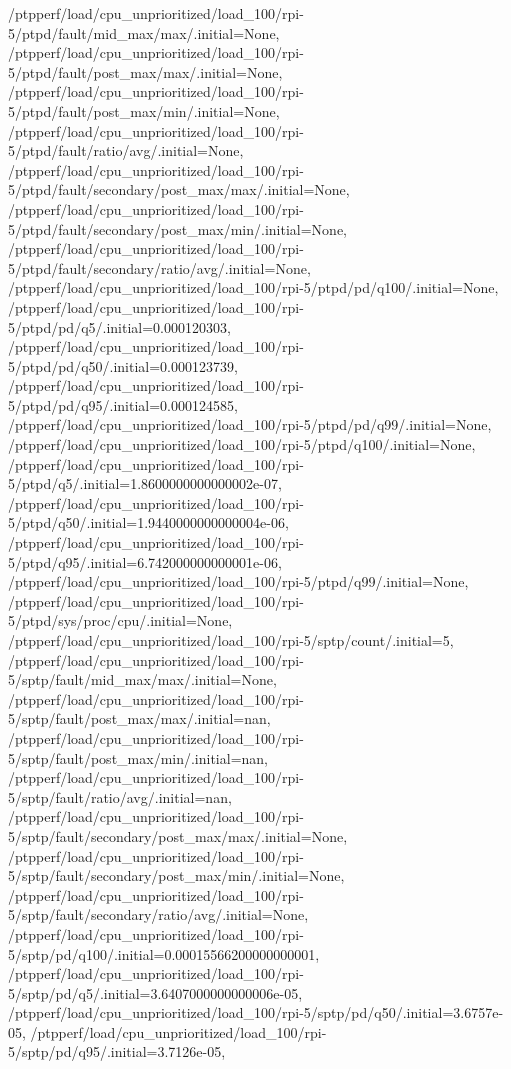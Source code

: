 {    /ptpperf/load/cpu_unprioritized/load_100/rpi-5/ptpd/fault/mid_max/max/.initial=None,
    /ptpperf/load/cpu_unprioritized/load_100/rpi-5/ptpd/fault/post_max/max/.initial=None,
    /ptpperf/load/cpu_unprioritized/load_100/rpi-5/ptpd/fault/post_max/min/.initial=None,
    /ptpperf/load/cpu_unprioritized/load_100/rpi-5/ptpd/fault/ratio/avg/.initial=None,
    /ptpperf/load/cpu_unprioritized/load_100/rpi-5/ptpd/fault/secondary/post_max/max/.initial=None,
    /ptpperf/load/cpu_unprioritized/load_100/rpi-5/ptpd/fault/secondary/post_max/min/.initial=None,
    /ptpperf/load/cpu_unprioritized/load_100/rpi-5/ptpd/fault/secondary/ratio/avg/.initial=None,
    /ptpperf/load/cpu_unprioritized/load_100/rpi-5/ptpd/pd/q100/.initial=None,
    /ptpperf/load/cpu_unprioritized/load_100/rpi-5/ptpd/pd/q5/.initial=0.000120303,
    /ptpperf/load/cpu_unprioritized/load_100/rpi-5/ptpd/pd/q50/.initial=0.000123739,
    /ptpperf/load/cpu_unprioritized/load_100/rpi-5/ptpd/pd/q95/.initial=0.000124585,
    /ptpperf/load/cpu_unprioritized/load_100/rpi-5/ptpd/pd/q99/.initial=None,
    /ptpperf/load/cpu_unprioritized/load_100/rpi-5/ptpd/q100/.initial=None,
    /ptpperf/load/cpu_unprioritized/load_100/rpi-5/ptpd/q5/.initial=1.8600000000000002e-07,
    /ptpperf/load/cpu_unprioritized/load_100/rpi-5/ptpd/q50/.initial=1.9440000000000004e-06,
    /ptpperf/load/cpu_unprioritized/load_100/rpi-5/ptpd/q95/.initial=6.742000000000001e-06,
    /ptpperf/load/cpu_unprioritized/load_100/rpi-5/ptpd/q99/.initial=None,
    /ptpperf/load/cpu_unprioritized/load_100/rpi-5/ptpd/sys/proc/cpu/.initial=None,
    /ptpperf/load/cpu_unprioritized/load_100/rpi-5/sptp/count/.initial=5,
    /ptpperf/load/cpu_unprioritized/load_100/rpi-5/sptp/fault/mid_max/max/.initial=None,
    /ptpperf/load/cpu_unprioritized/load_100/rpi-5/sptp/fault/post_max/max/.initial=nan,
    /ptpperf/load/cpu_unprioritized/load_100/rpi-5/sptp/fault/post_max/min/.initial=nan,
    /ptpperf/load/cpu_unprioritized/load_100/rpi-5/sptp/fault/ratio/avg/.initial=nan,
    /ptpperf/load/cpu_unprioritized/load_100/rpi-5/sptp/fault/secondary/post_max/max/.initial=None,
    /ptpperf/load/cpu_unprioritized/load_100/rpi-5/sptp/fault/secondary/post_max/min/.initial=None,
    /ptpperf/load/cpu_unprioritized/load_100/rpi-5/sptp/fault/secondary/ratio/avg/.initial=None,
    /ptpperf/load/cpu_unprioritized/load_100/rpi-5/sptp/pd/q100/.initial=0.00015566200000000001,
    /ptpperf/load/cpu_unprioritized/load_100/rpi-5/sptp/pd/q5/.initial=3.6407000000000006e-05,
    /ptpperf/load/cpu_unprioritized/load_100/rpi-5/sptp/pd/q50/.initial=3.6757e-05,
    /ptpperf/load/cpu_unprioritized/load_100/rpi-5/sptp/pd/q95/.initial=3.7126e-05,
}
